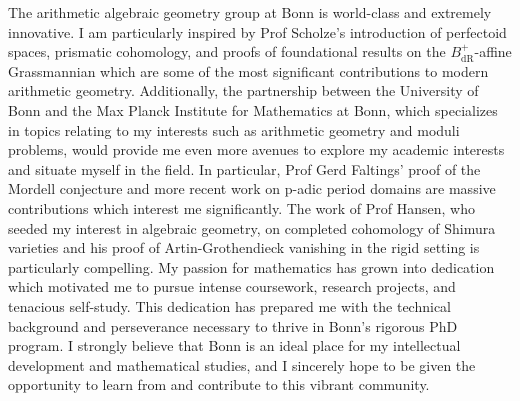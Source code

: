 \documentclass[11pt]{article}
\begin{document}
\par
The arithmetic algebraic geometry group at Bonn is world-class and extremely innovative. I am particularly inspired by Prof Scholze’s introduction of perfectoid spaces, prismatic cohomology, and proofs of foundational results on the $B_{\mathrm{dR}}^+$-affine Grassmannian which are some of the most significant contributions to modern arithmetic geometry. Additionally, the partnership between the University of Bonn and the Max Planck Institute for Mathematics at Bonn, which specializes in topics relating to my interests such as arithmetic geometry and moduli problems, would provide me even more avenues to explore my academic interests and situate myself in the field. In particular, Prof Gerd Faltings’ proof of the Mordell conjecture and more recent work on p-adic period domains are massive contributions which interest me significantly. The work of Prof Hansen, who seeded my interest in algebraic geometry, on completed cohomology of Shimura varieties and his proof of Artin-Grothendieck vanishing in the rigid setting is particularly compelling. My passion for mathematics has grown into dedication which motivated me to pursue intense coursework, research projects, and tenacious self-study. This dedication has prepared me with the technical background and perseverance necessary to thrive in Bonn’s rigorous PhD program. I strongly believe that Bonn is an ideal place for my intellectual development and mathematical studies, and I sincerely hope to be given the opportunity to learn from and contribute to this vibrant community.  
\end{document}
